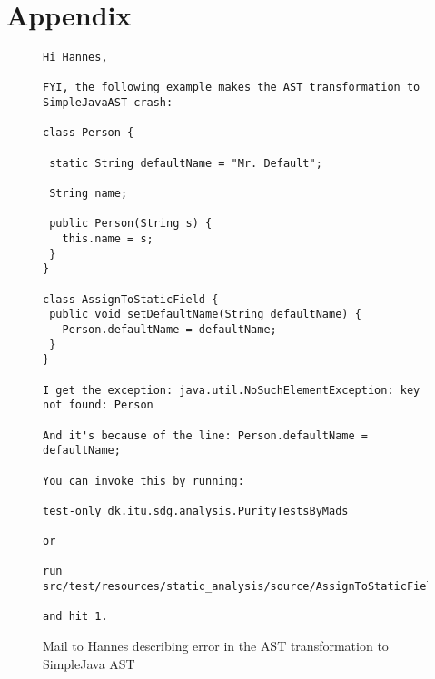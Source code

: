 \documentclass[11pt]{exam}
\begin{document}
\section{Appendix}

\begin{figure}[b]
\begin{lstlisting}
Hi Hannes,

FYI, the following example makes the AST transformation to SimpleJavaAST crash:

class Person {

 static String defaultName = "Mr. Default";

 String name;

 public Person(String s) {
   this.name = s;
 }
}

class AssignToStaticField {
 public void setDefaultName(String defaultName) {
   Person.defaultName = defaultName;
 }
}

I get the exception: java.util.NoSuchElementException: key not found: Person

And it's because of the line: Person.defaultName = defaultName;

You can invoke this by running:

test-only dk.itu.sdg.analysis.PurityTestsByMads

or

run src/test/resources/static_analysis/source/AssignToStaticField.java

and hit 1.
\end{lstlisting}
  \caption{Mail to Hannes describing error in the AST transformation to SimpleJava AST}
  \label{mail_to_hannes}
\end{figure}
\end{document}
